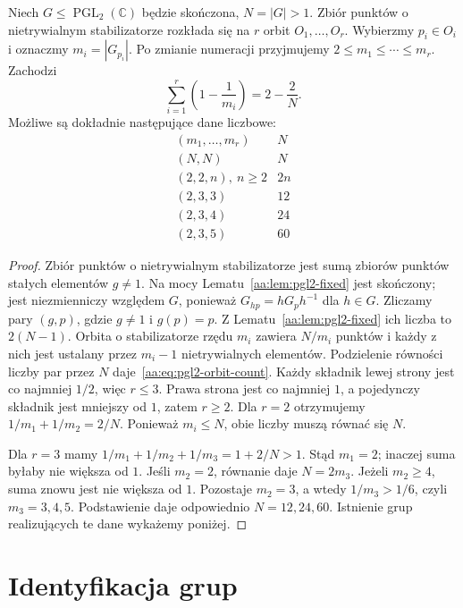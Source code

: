 \begin{twierdzenie}
\label{aa:tw:pgl2-signatures}
Niech $G\le\operatorname{PGL}_2(\mathbb C)$ będzie
skończona, $N=|G|>1$. Zbiór punktów o nietrywialnym
stabilizatorze rozkłada się na $r$ orbit $O_1,\ldots,O_r$.
Wybierzmy $p_i\in O_i$ i oznaczmy $m_i=|G_{p_i}|$.
Po zmianie numeracji przyjmujemy $2\le m_1\le\cdots\le m_r$.
Zachodzi
\begin{equation}\label{aa:eq:pgl2-orbit-count}
 \sum_{i=1}^r\left(1-\frac1{m_i}\right)=2-\frac2N .
\end{equation}
Możliwe są dokładnie następujące dane liczbowe:
\[
\begin{array}{c|c}
(m_1,\ldots,m_r)&N\\ \hline
(N,N)&N\\
(2,2,n),\ n\ge2&2n\\
(2,3,3)&12\\
(2,3,4)&24\\
(2,3,5)&60
\end{array}
\]
\end{twierdzenie}
\begin{proof}
Zbiór punktów o nietrywialnym stabilizatorze jest
sumą zbiorów punktów stałych elementów $g\ne1$.
Na mocy Lematu~\ref{aa:lem:pgl2-fixed} jest skończony;
jest niezmienniczy względem $G$, ponieważ
$G_{hp}=hG_ph^{-1}$ dla $h\in G$.
Zliczamy pary $(g,p)$, gdzie $g\ne1$ i $g(p)=p$.
Z Lematu~\ref{aa:lem:pgl2-fixed} ich liczba to $2(N-1)$.
Orbita o stabilizatorze rzędu $m_i$ zawiera $N/m_i$
punktów i każdy z nich jest ustalany przez $m_i-1$
nietrywialnych elementów. Podzielenie równości liczby
par przez $N$ daje~\eqref{aa:eq:pgl2-orbit-count}.
Każdy składnik lewej strony jest co najmniej $1/2$,
więc $r\le3$. Prawa strona jest co najmniej $1$,
a pojedynczy składnik jest mniejszy od $1$, zatem $r\ge2$.
Dla $r=2$ otrzymujemy $1/m_1+1/m_2=2/N$.
Ponieważ $m_i\le N$, obie liczby muszą równać się $N$.

Dla $r=3$ mamy $1/m_1+1/m_2+1/m_3=1+2/N>1$.
Stąd $m_1=2$; inaczej suma byłaby nie większa od $1$.
Jeśli $m_2=2$, równanie daje $N=2m_3$.
Jeżeli $m_2\ge4$, suma znowu jest nie większa od $1$.
Pozostaje $m_2=3$, a wtedy $1/m_3>1/6$,
czyli $m_3=3,4,5$. Podstawienie daje odpowiednio
$N=12,24,60$. Istnienie grup realizujących te dane
wykażemy poniżej.
\end{proof}

\section{Identyfikacja grup}

